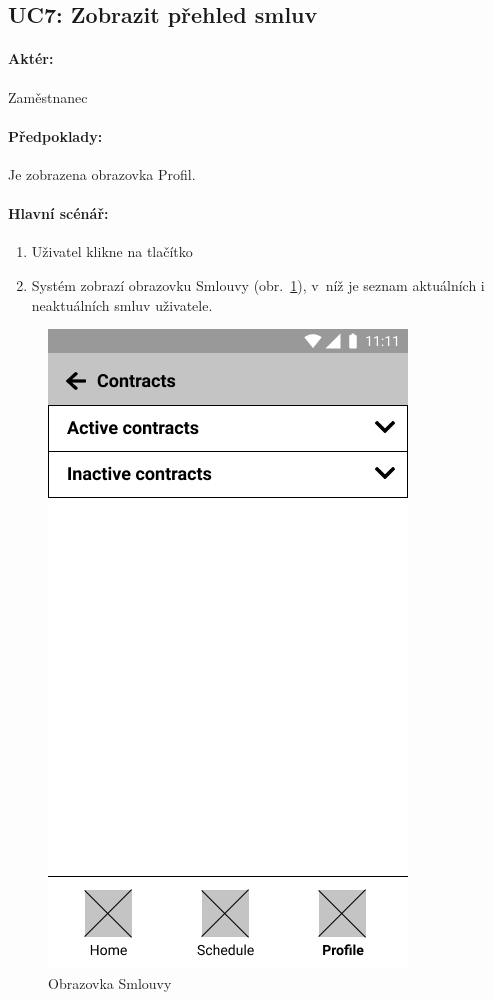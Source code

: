 \documentclass[twoside]{ctuthesis}
\begin{document}
\newpage
\subsection{UC7: Zobrazit přehled smluv}
\paragraph{Aktér:} Zaměstnanec
\paragraph{Předpoklady:} Je zobrazena obrazovka Profil.
\paragraph{Hlavní scénář:}
\begin{enumerate}
	\item Uživatel klikne na tlačítko 
	\item Systém zobrazí obrazovku Smlouvy (obr.~\ref{fig:contracts}), v~níž je seznam aktuálních i neaktuálních smluv uživatele.
\end{enumerate}

\begin{figure}[h!]
		\includegraphics[scale=.35]{img/contracts.png}
		\caption{Obrazovka Smlouvy}
		\label{fig:contracts}
\end{figure}
\end{document}
